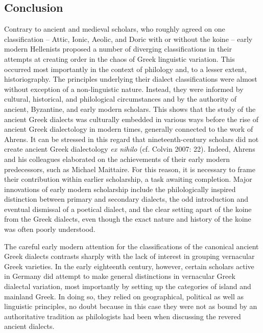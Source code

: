 \subsection{Conclusion}
\hypertarget{Toc19704817}{}\begin{styleStandard}
Contrary to ancient and medieval scholars, who roughly agreed on one classification – Attic, Ionic, Aeolic, and Doric with or without the koine – early modern Hellenists proposed a number of diverging classifications in their attempts at creating order in the chaos of Greek linguistic variation. This occurred most importantly in the context of philology and, to a lesser extent, historiography. The principles underlying their dialect classifications were almost without exception of a non-linguistic nature. Instead, they were informed by cultural, historical, and philological circumstances and by the authority of ancient, Byzantine, and early modern scholars. This shows that the study of the ancient Greek dialects was culturally embedded in various ways before the rise of ancient Greek dialectology in modern times, generally connected to the work of Ahrens. It can be stressed in this regard that nineteenth-century scholars did not create ancient Greek dialectology \textit{ex nihilo} (cf. Colvin 2007: 22). Indeed, Ahrens and his colleagues elaborated on the achievements of their early modern predecessors, such as Michael Maittaire. For this reason, it is necessary to frame their contribution within earlier scholarship, a task awaiting completion. Major innovations of early modern scholarship include the philologically inspired distinction between primary and secondary dialects, the odd introduction and eventual dismissal of a poetical dialect, and the clear setting apart of the koine from the Greek dialects, even though the exact nature and history of the koine was often poorly understood.
\end{styleStandard}

\begin{styleStandard}
The careful early modern attention for the classifications of the canonical ancient Greek dialects contrasts sharply with the lack of interest in grouping vernacular Greek varieties. In the early eighteenth century, however, certain scholars active in Germany did attempt to make general distinctions in vernacular Greek dialectal variation, most importantly by setting up the categories of island and mainland Greek. In doing so, they relied on geographical, political as well as linguistic principles, no doubt because in this case they were not as bound by an authoritative tradition as philologists had been when discussing the revered ancient dialects.
\end{styleStandard}

